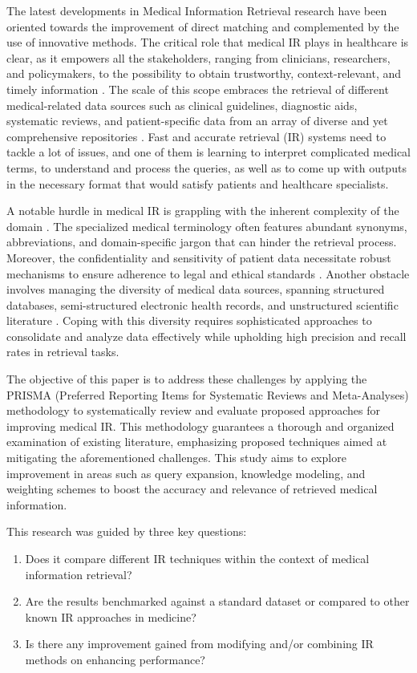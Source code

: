 \documentclass[conference]{IEEEtran}
\begin{document}
The latest developments in Medical Information Retrieval research have been oriented towards the improvement of direct matching and complemented by the use of innovative methods. The critical role that medical IR plays in healthcare is clear, as it empowers all the stakeholders, ranging from clinicians, researchers, and policymakers, to the possibility to obtain trustworthy, context-relevant, and timely information \cite{McGowan2009}. The scale of this scope embraces the retrieval of different medical-related data sources such as clinical guidelines, diagnostic aids, systematic reviews, and patient-specific data from an array of diverse and yet comprehensive repositories \cite{Cadag2010}. Fast and accurate retrieval (IR) systems need to tackle a lot of issues, and one of them is learning to interpret complicated medical terms, to understand and process the queries, as well as to come up with outputs in the necessary format that would satisfy patients and healthcare specialists.

A notable hurdle in medical IR is grappling with the inherent complexity of the domain \cite{Goeuriot2014}. The specialized medical terminology often features abundant synonyms, abbreviations, and domain-specific jargon that can hinder the retrieval process. Moreover, the confidentiality and sensitivity of patient data necessitate robust mechanisms to ensure adherence to legal and ethical standards \cite{McCarthy2008}. Another obstacle involves managing the diversity of medical data sources, spanning structured databases, semi-structured electronic health records, and unstructured scientific literature \cite{Quamar2020}. Coping with this diversity requires sophisticated approaches to consolidate and analyze data effectively while upholding high precision and recall rates in retrieval tasks.

The objective of this paper is to address these challenges by applying the PRISMA (Preferred Reporting Items for Systematic Reviews and Meta-Analyses) methodology to systematically review and evaluate proposed approaches for improving medical IR. This methodology guarantees a thorough and organized examination of existing literature, emphasizing proposed techniques aimed at mitigating the aforementioned challenges. This study aims to explore improvement in areas such as query expansion, knowledge modeling, and weighting schemes to boost the accuracy and relevance of retrieved medical information.

This research was guided by three key questions: 
\begin{enumerate}
    \item Does it compare different IR techniques within the context of medical information retrieval?
    \item Are the results benchmarked against a standard dataset or compared to other known IR approaches in medicine?
    \item Is there any improvement gained from modifying and/or combining IR methods on enhancing performance?
\end{enumerate}
\end{document}
